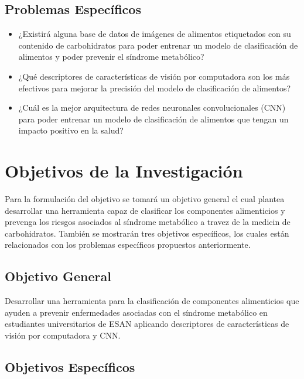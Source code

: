 \subsection{Problemas Espec\'{i}ficos}
\newcommand{\Pbone}{
¿Existirá alguna base de datos de imágenes de alimentos etiquetados con su contenido de carbohidratos para poder entrenar un modelo de clasificación de alimentos y poder prevenir el síndrome metabólico?
}
\newcommand{\Pbtwo}{
¿Qué descriptores de características de visión por computadora son los más efectivos para mejorar la precisión del modelo de clasificación de alimentos?
}
\newcommand{\Pbthree}{
¿Cuál es la mejor arquitectura de redes neuronales convolucionales (CNN) para poder entrenar un modelo de clasificación de alimentos que tengan un impacto positivo en la salud?
}

\begin{itemize}
	\item \Pbone
	\item \Pbtwo
	\item \Pbthree
\end{itemize}

\section{Objetivos de la Investigación}

Para la formulación del objetivo se tomará un objetivo general el cual plantea desarrollar una herramienta capaz de clasificar los componentes alimenticios y prevenga los riesgos asociados al  síndrome metabólico a travez de la medicin de carbohidratos. También se mostrarán tres objetivos específicos, los cuales están relacionados con los problemas específicos propuestos anteriormente. 

\subsection{Objetivo General}
\newcommand{\ObjetivoGeneral}{
Desarrollar una herramienta para la clasificación de componentes alimenticios que
ayuden a prevenir enfermedades asociadas con el síndrome metabólico en estudiantes universitarios de ESAN aplicando descriptores de características de visión por computadora y CNN.
}
\ObjetivoGeneral
\subsection{Objetivos Espec\'{i}ficos}
\newcommand{\Objone}{
Encontrar y/o construir una base de datos de imágenes de alimentos etiquetados con su contenido de carbohidratos para el entrenamiento de un modelo de clasificación de componentes alimenticios para poder prevenir el síndrome metabólico.

}
\newcommand{\Objtwo}{
Identificar los descriptores de características de visión por computadora más efectivos para mejorar la precisión del modelo de clasificación de alimentos.
}
\newcommand{\Objthree}{
Determinar la mejor arquitectura de redes neuronales convolucionales (CNN) para entrenar un modelo de clasificación de alimentos que permita identificar con precisión aquellos que tengan un impacto positivo en la salud.

}


